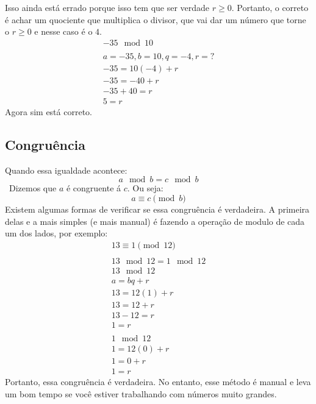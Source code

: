 \documentclass[12pt]{article}
\begin{document}
    Isso ainda está errado porque isso tem que ser verdade $r \geq 0$. Portanto, o correto é achar um quociente que multiplica o divisor, que vai dar um número que torne o $r \geq 0$ e nesse caso é o $4$.
    \begin{equation}
        \begin{split}
            -35 \mod 10 \\\\
            a = -35, b = 10, q = -4, r = ?\\
            -35 = 10(-4) + r\\
            -35 = -40 + r\\
            -35 + 40 = r\\
            5 = r
        \end{split}
    \end{equation}
    Agora sim está correto.
    \subsection{Congruência}
    Quando essa igualdade acontece:
    \[a\mod b = c \mod b\]\
    Dizemos que $a$ é congruente á $c$. Ou seja:
    \[a \equiv c \pmod{b}\]
    Existem algumas formas de verificar se essa congruência é verdadeira. A primeira delas e a mais simples (e mais manual) é fazendo a operação de modulo de cada um dos lados, por exemplo:
    \begin{equation}
        \begin{split}
            13 \equiv 1 \pmod{12}\\\\
            13 \mod 12 = 1 \mod 12\\
            13\mod 12\\
            a = bq+r\\
            13 = 12(1) + r\\
            13 = 12 + r\\
            13 - 12 = r\\
            1 = r\\\\
            1 \mod 12\\
            1 = 12(0) + r\\
            1 = 0 + r\\
            1 = r
        \end{split}
    \end{equation}
    Portanto, essa congruência é verdadeira. No entanto, esse método é manual e leva um bom tempo se você estiver trabalhando com números muito grandes.
\end{document}
